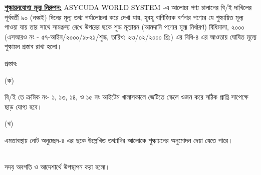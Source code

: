 \documentclass[12pt]{article}
\newcommand{\srofs}{এসআরও নং - ৫৭-আইন/২০০০/১৮২১/শুল্ক}
\newcommand{\srofsd}{তারিখ: ২৩/০২/২০০০ খ্রি:}
\begin{document}
\begin{minipage}[t]{0.95\linewidth}
\underline{\textbf{শুল্কায়নযোগ্য মূল্য নিরুপন:}} ASYCUDA WORLD SYSTEM
-এ আলোচ্য পণ্য চালানের বি/ই দাখিলের পূর্ববর্তী ৯০ (নব্বই) দিনের
মূল্য তথ্য পর্যালোচনা করে দেখা যায়, হুবহু বাণিজ্যিক বর্ণনার পণ্যের যে
শুল্কায়িত মূল্য পাওয়া যায় তার সাথে সামঞ্জস্য রেখে উপরের ছকে শুল্ক
মূল্যায়ন (আমদানি পণ্যের মূল্য নির্ধারণ) বিধিমালা, ২০০০
({\srofs}, {\srofsd})
এর বিধি-৪ এর আওতায় ঘোষিত মূল্যে শুল্কায়ন প্রস্তাব রাখা হলো।
\\
\end{minipage}
\begin{minipage}[t]{0.05\linewidth}
\hspace{0em}
\end{minipage}
\begin{minipage}[t]{0.95\linewidth}
প্রস্তাব:
\end{minipage}
\begin{minipage}[t]{0.05\linewidth}
\hspace{0em}
\end{minipage}
\begin{minipage}[t]{0.05\linewidth}
(ক)
\end{minipage}
\begin{minipage}[t]{0.90\linewidth}
বি/ই তে ক্রমিক নং- ১, ১৩, ১৪, ও ১৫ নং আইটেম খালাসকালে জেটিতে স্কেলে ওজন করে সঠিক প্রাপ্তি সাপেক্ষে ছাড় যোগ্য হবে।
\end{minipage}
\begin{minipage}[t]{0.05\linewidth}
\hspace{0em}
\end{minipage}
\begin{minipage}[t]{0.05\linewidth}
(খ)
\end{minipage}
\begin{minipage}[t]{0.90\linewidth}
এমতাবস্থায় নোট অনুচ্ছেদ-৪ এর ছকে উল্লেখিত তথ্যাদির আলোকে শুল্কায়নের অনুমোদন দেয়া যেতে পারে।
\\
\\
\end{minipage}
\begin{minipage}[t]{0.05\linewidth}
\hspace{0em}
\end{minipage}
\begin{minipage}[t]{0.95\linewidth}
সদয় অবগতি ও আদেশার্থে উপস্থাপন করা
হলো।
\end{minipage}
\end{document}
